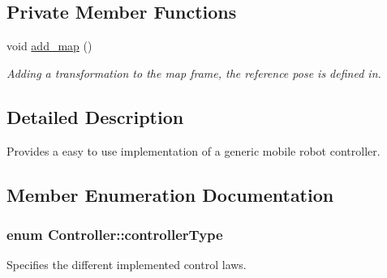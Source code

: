 \subsection*{Private Member Functions}
\begin{DoxyCompactItemize}
\item 
void \hyperlink{classController_ac3c2cc7b8afdf05ade60e03eaca88b91}{add\+\_\+map} ()\hypertarget{classController_ac3c2cc7b8afdf05ade60e03eaca88b91}{}\label{classController_ac3c2cc7b8afdf05ade60e03eaca88b91}

\begin{DoxyCompactList}\small\item\em Adding a transformation to the map frame, the reference pose is defined in. \end{DoxyCompactList}\end{DoxyCompactItemize}


\subsection{Detailed Description}
Provides a easy to use implementation of a generic mobile robot controller. 

\subsection{Member Enumeration Documentation}
\subsubsection[{\texorpdfstring{controller\+Type}{controllerType}}]{\setlength{\rightskip}{0pt plus 5cm}enum {\bf Controller\+::controller\+Type}}\hypertarget{classController_a86221d052db839985bd6e4d73013cd06}{}\label{classController_a86221d052db839985bd6e4d73013cd06}


Specifies the different implemented control laws. 


